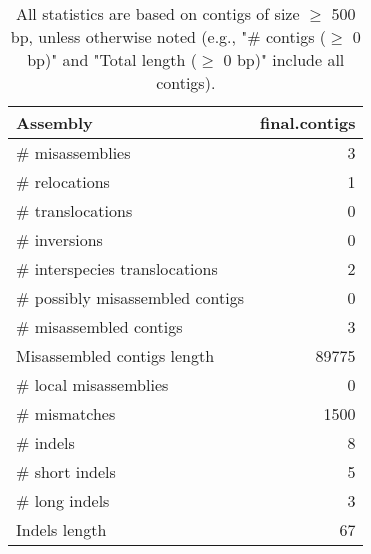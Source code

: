 \documentclass[12pt,a4paper]{article}
\begin{document}
\begin{table}[ht]
\begin{center}
\caption{All statistics are based on contigs of size $\geq$ 500 bp, unless otherwise noted (e.g., "\# contigs ($\geq$ 0 bp)" and "Total length ($\geq$ 0 bp)" include all contigs).}
\begin{tabular}{|l*{1}{|r}|}
\hline
Assembly & final.contigs \\ \hline
\# misassemblies & 3 \\ \hline
\hspace{5mm}\# relocations & 1 \\ \hline
\hspace{5mm}\# translocations & 0 \\ \hline
\hspace{5mm}\# inversions & 0 \\ \hline
\hspace{5mm}\# interspecies translocations & 2 \\ \hline
\# possibly misassembled contigs & 0 \\ \hline
\# misassembled contigs & 3 \\ \hline
Misassembled contigs length & 89775 \\ \hline
\# local misassemblies & 0 \\ \hline
\# mismatches & 1500 \\ \hline
\# indels & 8 \\ \hline
\hspace{5mm}\# short indels & 5 \\ \hline
\hspace{5mm}\# long indels & 3 \\ \hline
Indels length & 67 \\ \hline
\end{tabular}
\end{center}
\end{table}
\end{document}
